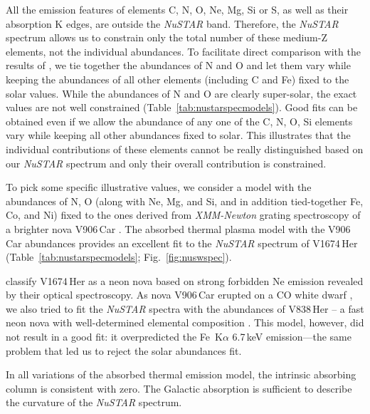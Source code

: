 \documentclass[a4paper,fleqn,usenatbib]{mnras}
\newcommand{\nova}{V1674\,Her}
\begin{document}
All the emission features of elements C, N, O, Ne, Mg,
Si or S, as well as their absorption K edges, are outside the {\em NuSTAR} band.
Therefore, the {\em NuSTAR} spectrum allows us to constrain only the total 
number of these medium-Z elements, not the individual abundances.
%
To facilitate direct comparison with the results of \cite{2020MNRAS.497.2569S,2022MNRAS.514.2239S}, we tie together
the abundances of N and O and let them vary while keeping the abundances of all other elements (including C and Fe) fixed to the solar values.
%
While the abundances of N and O are clearly super-solar, the exact values
are not well constrained (Table~\ref{tab:nustarspecmodels}). 
Good fits can be obtained even if we allow the abundance of any one of the C, N, O, Si elements vary while keeping all other abundances fixed to solar. This illustrates that the individual contributions of these elements cannot be really distinguished based on our {\em NuSTAR} spectrum and only their overall contribution is constrained.
%

To pick some specific illustrative values, we consider a model with the
abundances of N, O (along with Ne, Mg, and Si, and in addition tied-together Fe, Co, and Ni) 
fixed to the ones derived from {\em XMM-Newton} grating spectroscopy of 
a brighter nova V906\,Car \citep{2020MNRAS.497.2569S}.
The absorbed thermal plasma model with the V906\,Car
abundances provides an excellent fit to the {\em NuSTAR} spectrum of \nova{} 
(Table~\ref{tab:nustarspecmodels}; Fig.~\ref{fig:nuswspec}).

\cite{2021ATel14746....1W} classify \nova{} as a neon nova based on strong
forbidden Ne emission revealed by their optical spectroscopy. 
As nova V906\,Car erupted on a CO white dwarf \citep{2020MNRAS.497.2569S}, 
we also tried to fit the {\em NuSTAR} spectra with the abundances of V838\,Her -- a fast neon 
nova with well-determined elemental composition \citep{2007ApJ...657..453S}. 
This model, however, did not result in a good fit: %
it overpredicted the Fe~K$\alpha$ 6.7\,keV emission---the same problem that led us to reject the solar abundances fit.

In all variations of the absorbed thermal emission model, the intrinsic
absorbing column is consistent with zero. The Galactic absorption is
sufficient to describe the curvature of the {\em NuSTAR} spectrum.
\end{document}

